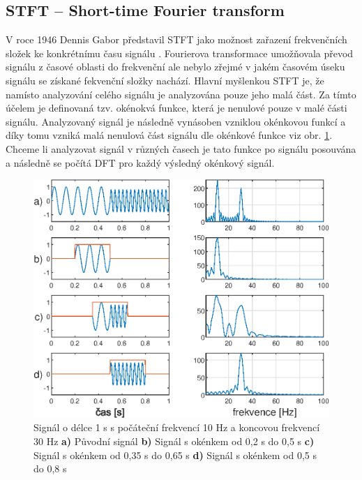   
  \subsection{STFT -- Short-time Fourier transform} \label{sec:STFT}

  V roce 1946 Dennis Gabor představil \acs{STFT} jako možnost zařazení frekvenčních složek ke konkrétnímu času signálu \cite{strichartz2003guide}.
  Fourierova transformace umožňovala převod signálu z časové oblasti do frekvenční ale nebylo zřejmé v jakém časovém úseku signálu se získané fekvenční složky nachází.
  Hlavní myšlenkou \acs{STFT} je, že namísto analyzování celého signálu je analyzována pouze jeho malá část.
  Za tímto účelem je definovaná tzv. okénokvá funkce, která je nenulové pouze v malé části signálu.
  Analyzovaný signál je následně vynásoben vzniklou okénkovou funkcí a díky tomu vzniká malá nenulová část signálu dle okénkové funkce viz obr. \ref{fig:STFT}.
  Chceme li analyzovat signál v různých časech je tato funkce po signálu posouvána a následně se počítá \acs{DFT} pro každý výsledný okénkový signál.

  \begin{figure}[H]
    \centering
    \includegraphics[width = 1\linewidth]{obrazky/STFT.eps}
    \caption{Signál o délce 1 s s počáteční frekvencí 10 Hz a koncovou frekvencí 30 Hz \textbf{a)} Původní signál \textbf{b)} Signál s okénkem od 0,2 s do 0,5 s \textbf{c)} Signál s okénkem od 0,35 s do 0,65 s \textbf{d)} Signál s okénkem od 0,5 s do 0,8 s \cite{fundamental_of_music_processing}}
    \label{fig:STFT}
  \end{figure}

